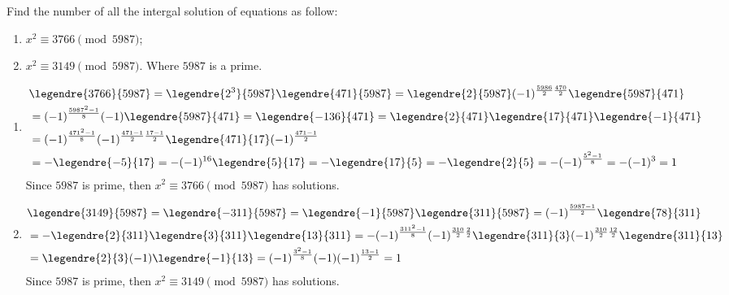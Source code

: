 \documentclass{ctexart}
\newif\ifpreface
\begin{document}
\large
\setlength{\baselineskip}{1.2em}
\ifpreface

\else
{}
\begin{problem}\label{pro:1}
  Find the number of all the intergal solution of equations as follow:
  \begin{enumerate}
    \item \(x^2 \equiv 3766 \pmod{5987}\);
    \item \(x^2 \equiv 3149 \pmod{5987}\).
      Where \(5987\) is a prime.
  \end{enumerate}
\end{problem}
\begin{solution}
\begin{enumerate}
  \item
    \begin{equation}
      \begin{aligned}
      &\legendre{3766}{5987}=\legendre{2^3}{5987}\legendre{471}{5987}=\legendre{2}{5987}(-1)^{\frac{5986}{2} \frac{470}{2}}\legendre{5987}{471}\\ 
      &=(-1)^{\frac{5987^2-1}{8}} (-1)\legendre{5987}{471}=\legendre{-136}{471}=\legendre{2}{471}\legendre{17}{471}\legendre{-1}{471}\\ 
      &=(-1)^{\frac{471^2-1}{8}}(-1)^{\frac{471-1}{2} \frac{17-1}{2}}\legendre{471}{17}(-1)^{\frac{471-1}{2}}\\ 
      &=-\legendre{-5}{17}=-(-1)^{16}\legendre{5}{17}=-\legendre{17}{5}=-\legendre{2}{5}=-(-1)^{\frac{5^2-1}{8}}=-(-1)^3=1
    \end{aligned}
    \end{equation}
    Since \(5987\) is prime, then \(x^2 \equiv 3766 \pmod{5987}\) has solutions.
  \item 
    \begin{equation} 
      \begin{aligned}
        &\legendre{3149}{5987}=\legendre{-311}{5987}=\legendre{-1}{5987}\legendre{311}{5987}=(-1)^{\frac{5987-1}{2}}\legendre{78}{311}\\ 
        &=-\legendre{2}{311}\legendre{3}{311}\legendre{13}{311}=-(-1)^{\frac{311^2-1}{8}}(-1)^{\frac{310}{2} \frac{2}{2}}\legendre{311}{3}(-1)^{\frac{310}{2} \frac{12}{2}}\legendre{311}{13}\\ 
        &=\legendre{2}{3}(-1)\legendre{-1}{13}=(-1)^{\frac{3^2-1}{8}}(-1)(-1)^{\frac{13-1}{2}}=1
      \end{aligned}
    \end{equation}
    Since \(5987\) is prime, then \(x^2 \equiv 3149 \pmod{5987}\) has solutions.
\end{enumerate}
  
\end{solution}
\end{document}
